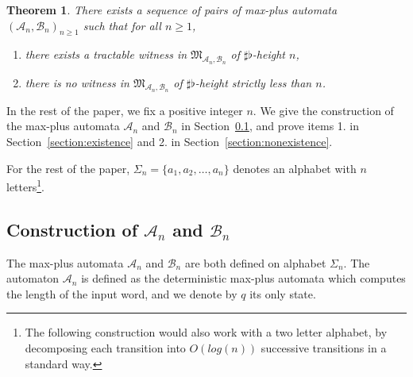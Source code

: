 \documentclass[10pt,a4paper]{amsart}
\newtheorem{thm}{Theorem}[section]
\theoremstyle{definition}
\numberwithin{equation}{section}
\theoremstyle{remark}
\newcommand{\ideal}{\mathfrak{M}}
\newcommand{\autA}{\mathcal{A}}
\newcommand{\autB}{\mathcal{B}}
\theoremstyle{remark}
\begin{document}
\begin{thm}
There exists a sequence of pairs of max-plus automata $(\autA_n, \autB_n)_{n \geq 1}$ such that for all $n \geq 1$,
\begin{enumerate}
\item there exists a tractable witness in $\ideal_{\autA_n,\autB_n}$ of $\sharp\flat$-height $n$,
\item there is no witness in $\ideal_{\autA_n,\autB_n}$ of $\sharp\flat$-height strictly less than $n$.
\end{enumerate}
\end{thm}

In the rest of the paper, we fix a positive integer $n$. We give the construction of the max-plus automata $\autA_n$ and $\autB_n$ in Section~\ref{section:constructionAB}, and prove items 1. in Section~\ref{section:existence} and 2. in Section~\ref{section:nonexistence}.

For the rest of the paper, $\Sigma_n = \{a_1, a_2, \ldots, a_n\}$ denotes an alphabet with $n$ letters\footnote{The following construction would also work with a two letter alphabet, by decomposing each transition into $O(log(n))$ successive transitions in a standard way.}. 

\subsection{Construction of \texorpdfstring{$\autA_n$}{A\_n} and \texorpdfstring{$\autB_n$}{B\_n}}
\label{section:constructionAB}

The max-plus automata $\autA_n$ and $\autB_n$ are both defined on alphabet $\Sigma_n$.
The automaton $\autA_n$ is defined as the deterministic max-plus automata which computes the length of the input word, and we denote by $q$ its only state. 

\begin{center}
\end{center}
\end{document}
